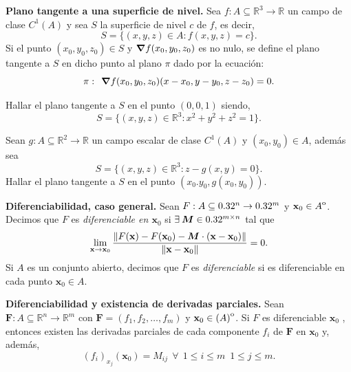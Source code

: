 \begin{definition}\textbf{Plano tangente a una superficie de nivel.}  Sea $f: A  \subseteq  \mathbb{R}^{3} \to \mathbb{R}$ un campo de clase $C^{1}(A)$ y sea $S$ la superficie de  nivel $c$ de $f$, es decir, $$S=\{(x,y,z) \in A: f(x,y,z)=c \}.$$ 
Si el punto $(x_0,y_0,z_0) \in S$ y  $\grad f(x_0,y_0,z_0)$ es no nulo,  se define el plano tangente a $S$ en dicho punto al plano $\pi$ dado por la ecuaci\'on: $$\pi: \:\: \grad f(x_0,y_0,z_0) (x-x_0,y-y_0,z-z_0)=0. $$ 
\end{definition}

\begin{tarea} Hallar el plano tangente a $S$ en el punto $(0,0,1)$ siendo,    $$S=\{(x,y,z)\in \mathbb{R}^{3} :  x^{2}+y^{2}+z^{2}=1 \}.$$ 
\end{tarea}
\begin{tarea} Sean $g: A  \subseteq  \mathbb{R}^{2} \to \mathbb{R}$ un campo escalar de clase $C^{1}(A)$  y $(x_0,y_0) \in A$, adem\'as sea   $$S=\{(x,y,z)\in \mathbb{R}^{3} :  z-g(x,y)=0 \}.$$  Hallar el plano tangente a $S$ en el punto $(x_0.y_0, g(x_0,y_0))$.
\end{tarea}


\begin{definition}\textbf{Diferenciabilidad, caso general.} \label{def:dif_general}  Sean $F: A  \subseteq  0.32^n \to 0.32^m$ y $\mathbf{x}_0 \in {\kern0ptA}^{\mathrm{o}}$. Decimos que $F$ es \emph{diferenciable en $\mathbf{x}_0$} si $\exists\:\boldsymbol{M} \in 0.32^{m \times n}$ tal que
\[
  \lim_{\mathbf{x} \to \mathbf{x}_0} \frac{\norm{F(\mathbf{x}) - F(\mathbf{x}_0) - \boldsymbol{M} \cdot (\mathbf{x} - \mathbf{x}_0)}}{\norm{\mathbf{x} - \mathbf{x}_0}} = 0.
\]
Si $A$ es un conjunto abierto, decimos que $F$ es \emph{diferenciable} si es diferenciable en cada punto $\mathbf{x}_0 \in A$.
\end{definition}

\begin{theorem}\textbf{Diferenciabilidad y existencia de derivadas parciales.} \label{teo:difDergeneral} Sean $\mathbf{F}: A  \subseteq  \mathbb{R}^{n} \to \mathbb{R}^{m}$ con $\mathbf{F}=(f_1, f_2, \dots, f_m)$ y $\mathbf{x}_0 \in {\kern0pt(A)}^{\mathrm{o}}$.  Si $F$ es diferenciable $\mathbf{x}_0$ , entonces existen las derivadas parciales de cada componente $f_{i}$  de $\mathbf{F}$ en $\mathbf{x}_0$ y, adem\'as,
\[
 (f_{i})_{ x_j}(\mathbf{x}_0) = M_{ij}  \:\: \forall \:\: 1\leq i \leq m  \:\;  1 \leq j \leq m.
\]

\end{theorem}


